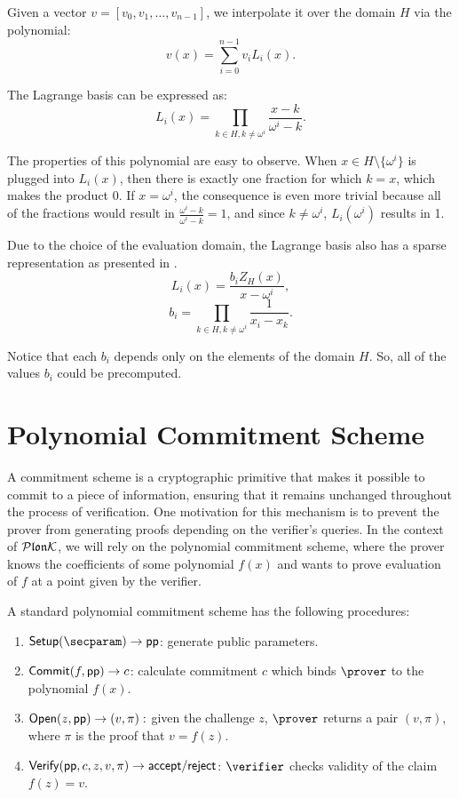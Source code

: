 Given a vector $v = [v_0, v_1, \ldots ,v_{n-1}]$, we interpolate it over the domain $H$ via the polynomial:$$v(x) = \sum_{i=0}^{n-1}v_iL_i(x).$$

The Lagrange basis can be expressed as:  $$L_i(x) = \prod_{k \in H, k \neq \omega^i} \frac{x-k}{\omega^i-k}.$$

The properties of this polynomial are easy to observe. When $x \in H \setminus \{ \omega^i \}$ is plugged into $L_i(x)$, then there is exactly one fraction for which $k = x$, which makes the product 0. If $x = \omega^i$, the consequence is even more trivial because all of the fractions would result in $\frac{\omega^i-k}{\omega^i-k} = 1$, and since $k \neq \omega^i$, $L_i(\omega^i)$ results in 1.

Due to the choice of the evaluation domain, the Lagrange basis also has a sparse representation as presented in \cite{BarycentricLagrange}. 
$$L_i(x) = \frac{b_iZ_H(x)}{x - \omega^i},$$
$$b_i = \prod_{k \in H, k \neq \omega^i} \frac{1}{x_i - x_k}.$$

Notice that each $b_i$ depends only on the elements of the domain $H$. So, all of the values $b_i$ could be precomputed.

\section{Polynomial Commitment Scheme}
A commitment scheme is a cryptographic primitive that makes it possible to commit to a piece of information, ensuring that it remains unchanged throughout the process of verification. One motivation for this mechanism is to prevent the prover from generating proofs depending on the verifier's queries. In the context of $\mathcal{P}\mathfrak{lon}\mathcal{K}$, we will rely on the polynomial commitment scheme, where the prover knows the coefficients of some polynomial $f(x)$ and wants to prove evaluation of $f$ at a point given by the verifier. 

A standard polynomial commitment scheme has the following procedures:
\begin{enumerate}
    \item $\mathsf{Setup(\secparam)} \rightarrow \publicparameter$: generate public parameters.
    \item $\mathsf{Commit}(f, \mathsf{pp}) \rightarrow c$: calculate commitment $c$ which binds $\prover$ to the polynomial $f(x)$.
    \item $\mathsf{Open}(z, \mathsf{pp}) \rightarrow (v, \pi):$ given the challenge $z$, $\prover$ returns a pair $(v, \pi)$, where $\pi$ is the proof that $v = f(z)$.
    \item $\mathsf{Verify}(\mathsf{pp}, c, z, v, \pi) \rightarrow \mathsf{accept/reject}$: $\verifier$ checks validity of the claim $f(z) = v$.
\end{enumerate}

